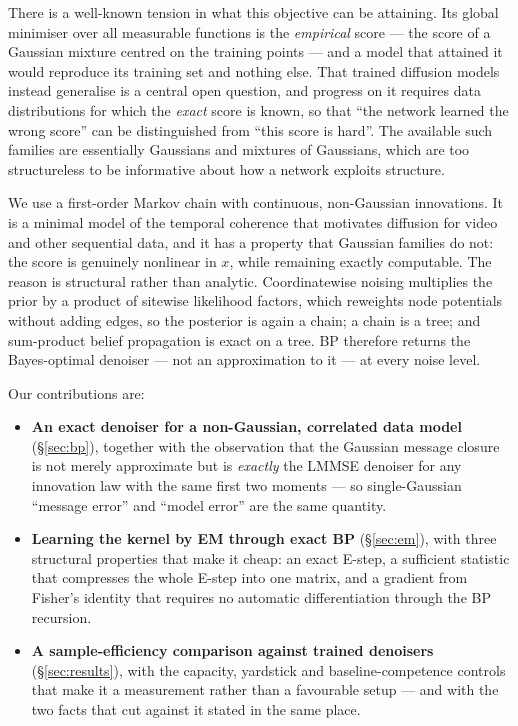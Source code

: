 \documentclass{article}
\begin{document}
There is a well-known tension in what this objective can be attaining. Its global minimiser
over all measurable functions is the \emph{empirical} score --- the score of a Gaussian
mixture centred on the training points --- and a model that attained it would reproduce its
training set and nothing else. That trained diffusion models instead generalise is a central
open question, and progress on it requires data distributions for which the \emph{exact}
score is known, so that ``the network learned the wrong score'' can be distinguished from
``this score is hard''. The available such families are essentially Gaussians and mixtures
of Gaussians, which are too structureless to be informative about how a network exploits
structure.

We use a first-order Markov chain with continuous, non-Gaussian innovations. It is a minimal
model of the temporal coherence that motivates diffusion for video and other sequential
data, and it has a property that Gaussian families do not: the score is genuinely nonlinear
in $x$, while remaining exactly computable. The reason is structural rather than analytic.
Coordinatewise noising multiplies the prior by a product of sitewise likelihood factors,
which reweights node potentials without adding edges, so the posterior is again a chain; a
chain is a tree; and sum-product belief propagation is exact on a tree. BP therefore returns
the Bayes-optimal denoiser --- not an approximation to it --- at every noise level.

Our contributions are:

\begin{itemize}
\item \textbf{An exact denoiser for a non-Gaussian, correlated data model} (\S\ref{sec:bp}),
      together with the observation that the Gaussian message closure is not merely
      approximate but is \emph{exactly} the LMMSE denoiser for any innovation law with the
      same first two moments --- so single-Gaussian ``message error'' and ``model error'' are
      the same quantity.
\item \textbf{Learning the kernel by EM through exact BP} (\S\ref{sec:em}), with three
      structural properties that make it cheap: an exact E-step, a sufficient statistic that
      compresses the whole E-step into one matrix, and a gradient from Fisher's identity that
      requires no automatic differentiation through the BP recursion.
\item \textbf{A sample-efficiency comparison against trained denoisers} (\S\ref{sec:results}),
      with the capacity, yardstick and baseline-competence controls that make it a
      measurement rather than a favourable setup --- and with the two facts that cut against
      it stated in the same place.
\end{itemize}
\end{document}
